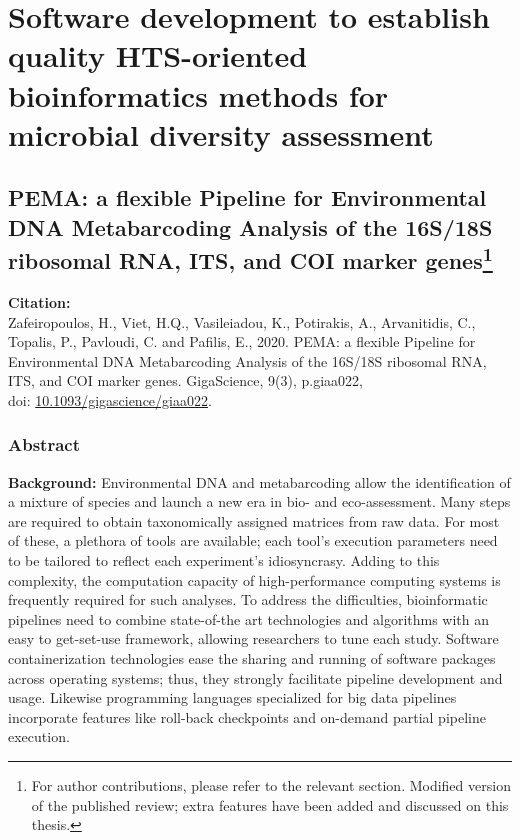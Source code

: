 % 
% 

\chapter{Software development to establish quality HTS-oriented bioinformatics methods for microbial diversity assessment}
\label{cha:2}


% 
% 
\section[PEMA: a flexible Pipeline for Environmental DNA Metabarcoding Analysis of the 16S/18S ribosomal RNA, ITS, and COI marker genes]{
   PEMA: a flexible Pipeline for Environmental DNA Metabarcoding Analysis of the 16S/18S ribosomal RNA, ITS, and COI marker genes\footnote{For author contributions, please refer to the relevant section. Modified version of the published review; extra features have been added and discussed on this thesis.}
}

   \textbf{Citation:} \\ 
   Zafeiropoulos, H., Viet, H.Q., Vasileiadou, K., Potirakis, A., Arvanitidis, C., Topalis, P., Pavloudi, C. and Pafilis, E., 2020. PEMA: a flexible Pipeline for Environmental DNA Metabarcoding Analysis of the 16S/18S ribosomal RNA, ITS, and COI marker genes. GigaScience, 9(3), p.giaa022, \\ 
   doi: \href{https://doi.org/10.1093/gigascience/giaa022}{10.1093/gigascience/giaa022}.


   \subsection{Abstract}
   \textbf{Background:} 
   Environmental DNA and metabarcoding allow the identification of a mixture of species and launch 
   a new era in bio- and eco-assessment. 
   Many steps are required to obtain taxonomically assigned matrices from raw data. For most of these, 
   a plethora of tools are available; each tool's execution parameters need to be tailored to reflect each experiment's idiosyncrasy. 
   Adding to this complexity, the computation capacity of high-performance computing systems is frequently required for such analyses. 
   To address the difficulties, bioinformatic pipelines need to combine state-of-the art technologies and 
   algorithms with an easy to get-set-use framework, allowing researchers to tune each study. 
   Software containerization technologies ease the sharing and running of software packages across operating systems; 
   thus, they strongly facilitate pipeline development and usage. 
   Likewise programming languages specialized for big data pipelines incorporate features like roll-back checkpoints and on-demand partial pipeline execution.

